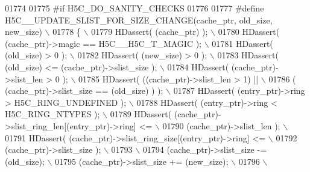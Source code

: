 \begin{DoxyCode}
01774 
01775 \textcolor{preprocessor}{#if H5C\_DO\_SANITY\_CHECKS}
01776 
01777 \textcolor{preprocessor}{#define H5C\_\_UPDATE\_SLIST\_FOR\_SIZE\_CHANGE(cache\_ptr, old\_size, new\_size)      \(\backslash\)}
01778 \textcolor{preprocessor}{\{                                                                             \(\backslash\)}
01779 \textcolor{preprocessor}{    HDassert( (cache\_ptr) );                                                  \(\backslash\)}
01780 \textcolor{preprocessor}{    HDassert( (cache\_ptr)->magic == H5C\_\_H5C\_T\_MAGIC );                       \(\backslash\)}
01781 \textcolor{preprocessor}{    HDassert( (old\_size) > 0 );                                               \(\backslash\)}
01782 \textcolor{preprocessor}{    HDassert( (new\_size) > 0 );                                               \(\backslash\)}
01783 \textcolor{preprocessor}{    HDassert( (old\_size) <= (cache\_ptr)->slist\_size );                        \(\backslash\)}
01784 \textcolor{preprocessor}{    HDassert( (cache\_ptr)->slist\_len > 0 );                                   \(\backslash\)}
01785 \textcolor{preprocessor}{    HDassert( ((cache\_ptr)->slist\_len > 1) ||                                 \(\backslash\)}
01786 \textcolor{preprocessor}{              ( (cache\_ptr)->slist\_size == (old\_size) ) );                    \(\backslash\)}
01787 \textcolor{preprocessor}{    HDassert( (entry\_ptr)->ring > H5C\_RING\_UNDEFINED );                       \(\backslash\)}
01788 \textcolor{preprocessor}{    HDassert( (entry\_ptr)->ring < H5C\_RING\_NTYPES );                          \(\backslash\)}
01789 \textcolor{preprocessor}{    HDassert( (cache\_ptr)->slist\_ring\_len[(entry\_ptr)->ring] <=               \(\backslash\)}
01790 \textcolor{preprocessor}{              (cache\_ptr)->slist\_len );                                       \(\backslash\)}
01791 \textcolor{preprocessor}{    HDassert( (cache\_ptr)->slist\_ring\_size[(entry\_ptr)->ring] <=              \(\backslash\)}
01792 \textcolor{preprocessor}{              (cache\_ptr)->slist\_size );                                      \(\backslash\)}
01793 \textcolor{preprocessor}{                                                                              \(\backslash\)}
01794 \textcolor{preprocessor}{    (cache\_ptr)->slist\_size -= (old\_size);                                    \(\backslash\)}
01795 \textcolor{preprocessor}{    (cache\_ptr)->slist\_size += (new\_size);                                    \(\backslash\)}
01796 \textcolor{preprocessor}{                                                                              \(\backslash\)}

\end{DoxyCode}
